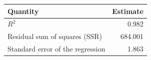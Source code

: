 \begin{center}
\begin{tabular}{lr}
\hline
Quantity & Estimate \\
\hline
$R^2$ & 0.982 \\
Residual sum of squares (SSR) & 684.001 \\
Standard error of the regression & 1.863 \\
\hline
\end{tabular}
\end{center}
